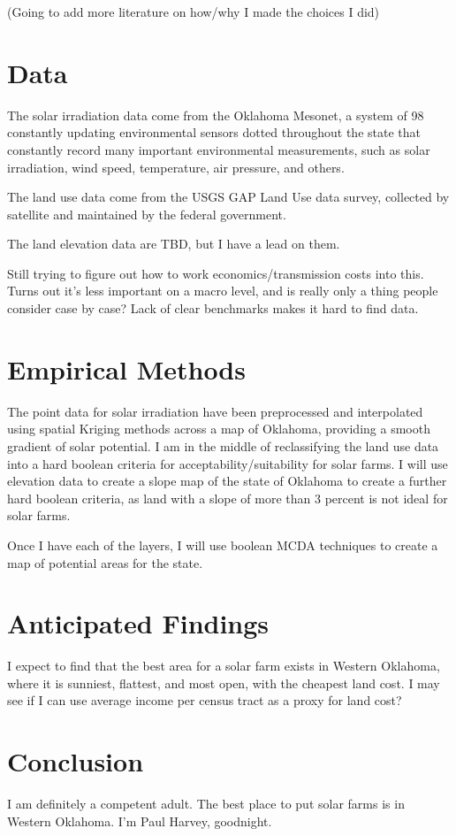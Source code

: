 \documentclass[a4paper,10pt]{article}
\begin{document}
(Going to add more literature on how/why I made the choices I did)

\section{Data}

The solar irradiation data come from the Oklahoma Mesonet, a system of 98 constantly updating environmental sensors dotted throughout the state that constantly record many important environmental measurements, such as solar irradiation, wind speed, temperature, air pressure, and others. 

The land use data come from the USGS GAP Land Use data survey, collected by satellite and maintained by the federal government. 

The land elevation data are TBD, but I have a lead on them.

Still trying to figure out how to work economics/transmission costs into this. Turns out it's less important on a macro level, and is really only a thing people consider case by case? Lack of clear benchmarks makes it hard to find data. 

\section{Empirical Methods}

The point data for solar irradiation have been preprocessed and interpolated using spatial Kriging methods across a map of Oklahoma, providing a smooth gradient of solar potential. I am in the middle of reclassifying the land use data into a hard boolean criteria for acceptability/suitability for solar farms. I will use elevation data to create a slope map of the state of Oklahoma to create a further hard boolean criteria, as land with a slope of more than 3 percent is not ideal for solar farms. 

Once I have each of the layers, I will use boolean MCDA techniques to create a map of potential areas for the state. 

\section{Anticipated Findings}

I expect to find that the best area for a solar farm exists in Western Oklahoma, where it is sunniest, flattest, and most open, with the cheapest land cost. I may see if I can use average income per census tract as a proxy for land cost? 

\section{Conclusion}

I am definitely a competent adult. The best place to put solar farms is in Western Oklahoma. I'm Paul Harvey, goodnight. 


\medskip


\end{document}
